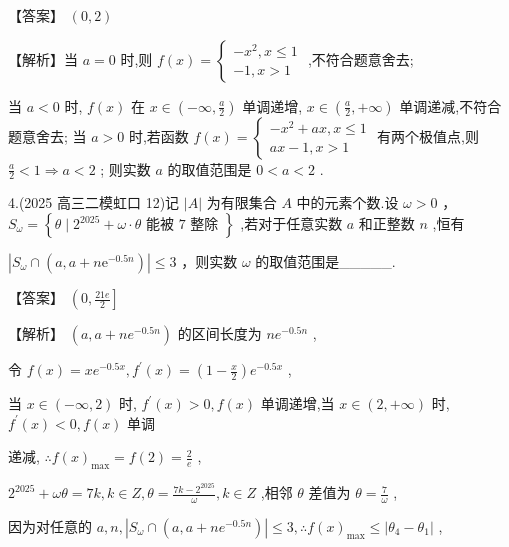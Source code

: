 \documentclass[10pt]{article}
\begin{document}
【答案】 \(\left( {0,2}\right)\)

【解析】当 \(a = 0\) 时,则 \(f\left( x\right)  = \left\{  \begin{array}{l}  - {x}^{2},x \leq  1 \\   - 1,x > 1 \end{array}\right.\) ,不符合题意舍去;

当 \(a < 0\) 时, \(f\left( x\right)\) 在 \(x \in  \left( {-\infty ,\frac{a}{2}}\right)\) 单调递增, \(x \in  \left( {\frac{a}{2}, + \infty }\right)\) 单调递减,不符合题意舍去; 当 \(a > 0\) 时,若函数 \(f\left( x\right)  = \left\{  \begin{array}{l}  - {x}^{2} + {ax},x \leq  1 \\  {ax} - 1,x > 1 \end{array}\right.\) 有两个极值点,则 \(\frac{a}{2} < 1 \Rightarrow  a < 2\) ; 则实数 \(a\) 的取值范围是 \(0 < a < 2\) .

4.(2025 高三二模虹口 12)记 \(\left| A\right|\) 为有限集合 \(A\) 中的元素个数.设 \(\omega  > 0\) ， \({S}_{\omega } = \left\{  {\theta  \mid  {2}^{2025} + \omega  \cdot  \theta \text{ 能被 7 整除 }}\right\}\) ,若对于任意实数 \(a\) 和正整数 \(n\) ,恒有

\(\left| {{S}_{\omega } \cap  \left( {a,a + n{\mathrm{e}}^{-{0.5n}}}\right) }\right|  \leq  3\) ，则实数 \(\omega\) 的取值范围是\_\_\_\_\_.

【答案】 \(\left( {0,\frac{21e}{2}}\right\rbrack\)

【解析】 \(\left( {a,a + n{e}^{-{0.5n}}}\right)\) 的区间长度为 \(n{e}^{-{0.5n}}\) ,

令 \(f\left( x\right)  = x{e}^{-{0.5x}},{f}^{\prime }\left( x\right)  = \left( {1 - \frac{x}{2}}\right) {e}^{-{0.5x}}\) ,

当 \(x \in  \left( {-\infty ,2}\right)\) 时, \({f}^{\prime }\left( x\right)  > 0,f\left( x\right)\) 单调递增,当 \(x \in  \left( {2, + \infty }\right)\) 时, \({f}^{\prime }\left( x\right)  < 0,f\left( x\right)\) 单调

递减, \(\therefore f{\left( x\right) }_{\max } = f\left( 2\right)  = \frac{2}{e}\) ,

\({2}^{2025} + {\omega \theta } = {7k},k \in  Z,\theta  = \frac{{7k} - {2}^{2025}}{\omega },k \in  Z\) ,相邻 \(\theta\) 差值为 \(\theta  = \frac{7}{\omega }\) ,

因为对任意的 \(a,n,\left| {{S}_{\omega } \cap  \left( {a,a + n{e}^{-{0.5n}}}\right) }\right|  \leq  3,\therefore f{\left( x\right) }_{\max } \leq  \left| {{\theta }_{4} - {\theta }_{1}}\right|\) ,
\end{document}
